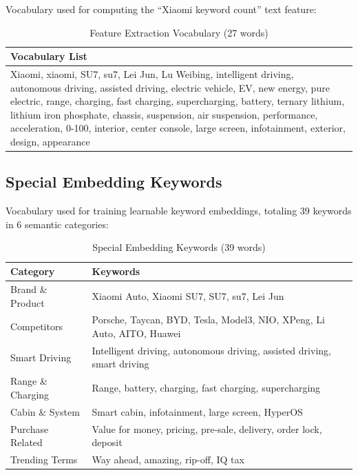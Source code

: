 \documentclass[10pt]{article}
\begin{document}
Vocabulary used for computing the ``Xiaomi keyword count'' text feature:

\begin{table}[H]
\centering
\caption{Feature Extraction Vocabulary (27 words)}
\label{tab:feature_keywords}
\begin{tabular}{p{12cm}}
\toprule
\textbf{Vocabulary List} \\
\midrule
Xiaomi, xiaomi, SU7, su7, Lei Jun, Lu Weibing, intelligent driving, autonomous driving, assisted driving, electric vehicle, EV, new energy, pure electric, range, charging, fast charging, supercharging, battery, ternary lithium, lithium iron phosphate, chassis, suspension, air suspension, performance, acceleration, 0-100, interior, center console, large screen, infotainment, exterior, design, appearance \\
\bottomrule
\end{tabular}
\end{table}

\subsection{Special Embedding Keywords}

Vocabulary used for training learnable keyword embeddings, totaling 39 keywords in 6 semantic categories:

\begin{table}[H]
\centering
\caption{Special Embedding Keywords (39 words)}
\label{tab:embed_keywords}
\begin{tabular}{ll}
\toprule
\textbf{Category} & \textbf{Keywords} \\
\midrule
Brand \& Product & Xiaomi Auto, Xiaomi SU7, SU7, su7, Lei Jun \\
Competitors & Porsche, Taycan, BYD, Tesla, Model3, NIO, XPeng, Li Auto, AITO, Huawei \\
Smart Driving & Intelligent driving, autonomous driving, assisted driving, smart driving \\
Range \& Charging & Range, battery, charging, fast charging, supercharging \\
Cabin \& System & Smart cabin, infotainment, large screen, HyperOS \\
Purchase Related & Value for money, pricing, pre-sale, delivery, order lock, deposit \\
Trending Terms & Way ahead, amazing, rip-off, IQ tax \\
\bottomrule
\end{tabular}
\end{table}
\end{document}
